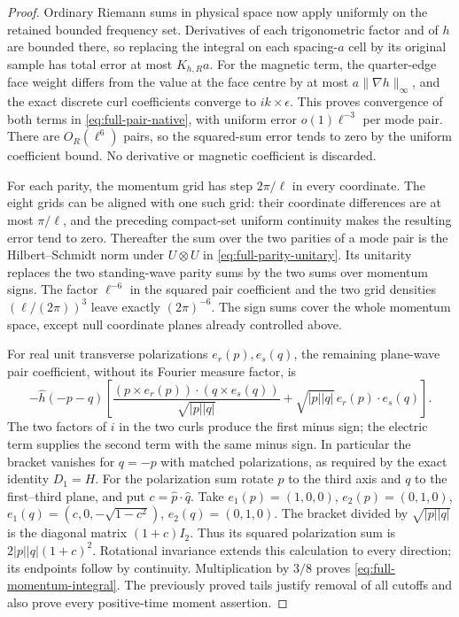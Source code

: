 \begin{proof}
Ordinary Riemann sums in physical space now apply uniformly on the
retained bounded frequency set. Derivatives of each trigonometric
factor and of $h$ are bounded there, so replacing the integral on
each spacing-$a$ cell by its original sample has total error at most
$K_{h,R}a$. For the magnetic term, the quarter-edge face weight
differs from the value at the face centre by at most
$a\|\nabla h\|_\infty$, and the exact discrete curl coefficients
converge to $ik\times\epsilon$. This proves convergence of both
terms in \eqref{eq:full-pair-native}, with uniform error
$o(1)\ell^{-3}$ per mode pair. There are $O_R(\ell^6)$ pairs,
so the squared-sum error tends to zero by the uniform coefficient
bound. No derivative or magnetic coefficient is discarded.

For each parity, the momentum grid has step $2\pi/\ell$ in every
coordinate. The eight grids can be aligned with one such grid:
their coordinate differences are at most $\pi/\ell$, and the
preceding compact-set uniform continuity makes the resulting error
tend to zero. Thereafter the sum over the two parities of a mode
pair is the Hilbert--Schmidt norm under $U\otimes U$ in
\eqref{eq:full-parity-unitary}. Its unitarity replaces the two
standing-wave parity sums by the two sums over momentum signs.
The factor $\ell^{-6}$ in the squared pair coefficient and the
two grid densities $(\ell/(2\pi))^3$ leave exactly $(2\pi)^{-6}$.
The sign sums cover the whole momentum space, except null coordinate
planes already controlled above.

For real unit transverse polarizations $e_r(p),e_s(q)$, the remaining
plane-wave pair coefficient, without its Fourier measure factor, is
\begin{equation}\label{eq:full-plane-kernel}
 -\widehat h(-p-q)\left[
 \frac{ (p\times e_r(p))\cdot(q\times e_s(q))}{\sqrt{|p||q|}}
          +\sqrt{|p||q|}\,e_r(p)\cdot e_s(q)\right].
\end{equation}
The two factors of $i$ in the two curls produce the first minus
sign; the electric term supplies the second term with the same
minus sign. In particular the bracket vanishes for $q=-p$ with
matched polarizations, as required by the exact identity $D_1=H$.
For the polarization sum rotate $p$ to the third axis and $q$ to
the first--third plane, and put $c=\widehat p\cdot\widehat q$.
Take $e_1(p)=(1,0,0)$, $e_2(p)=(0,1,0)$,
$e_1(q)=(c,0,-\sqrt{1-c^2})$, $e_2(q)=(0,1,0)$.
The bracket divided by $\sqrt{|p||q|}$ is the diagonal matrix
$(1+c)I_2$. Thus its squared polarization sum is
$2|p||q|(1+c)^2$. Rotational invariance extends this calculation
to every direction; its endpoints follow by continuity.
Multiplication by $3/8$ proves \eqref{eq:full-momentum-integral}.
The previously proved tails justify removal of all cutoffs and
also prove every positive-time moment assertion.
\end{proof}


